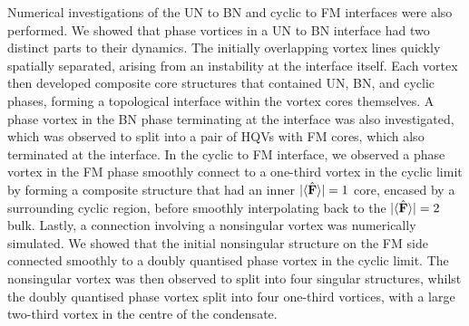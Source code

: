 Numerical investigations of the UN to BN and cyclic to FM interfaces were also
performed.
We showed that phase vortices in a UN to BN interface had two distinct parts to
their dynamics.
The initially overlapping vortex lines quickly spatially separated, arising from
an instability at the interface itself.
Each vortex then developed composite core structures that contained UN, BN, and
cyclic phases, forming a topological interface within the vortex cores
themselves.
A phase vortex in the BN phase terminating at the interface was also
investigated, which was observed to split into a pair of HQVs with FM cores,
which also terminated at the interface.
In the cyclic to FM interface, we observed a phase vortex in the FM phase
smoothly connect to a one-third vortex in the cyclic limit by forming a
composite structure that had an inner \(|\langle \hat{\vb{F}} \rangle |=1\) core, encased by a
surrounding cyclic region, before smoothly interpolating back to the
\(|\langle \hat{\vb{F}} \rangle |=2\) bulk.
Lastly, a connection involving a nonsingular vortex was numerically simulated.
We showed that the initial nonsingular structure on the FM side connected
smoothly to a doubly quantised phase vortex in the cyclic limit.
The nonsingular vortex was then observed to split into four singular structures,
whilst the doubly quantised phase vortex split into four one-third vortices,
with a large two-third vortex in the centre of the condensate.